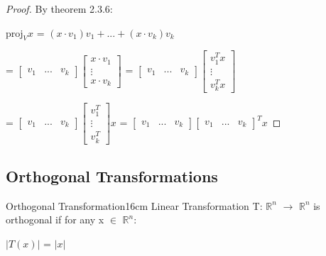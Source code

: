     \begin{proof}
        By {\color{red} theorem 2.3.6}:

        \hspace{0.5cm}
        $\text{proj}_Vx$
        = $(x \cdot v_1)v_1 + ... + (x \cdot v_k)v_k$
        
        \hspace{1.9cm}
        =
        $\begin{bmatrix}
            v_1 & ... & v_k
        \end{bmatrix}
        \begin{bmatrix}
            x \cdot v_1 \\
            \vdots \\
            x \cdot v_k
        \end{bmatrix}$ =
        $\begin{bmatrix}
            v_1 & ... & v_k
        \end{bmatrix}
        \begin{bmatrix}
            v_1^Tx \\
            \vdots \\
            v_k^Tx
        \end{bmatrix}$
        
        \hspace{1.9cm}
        =
        $\begin{bmatrix}
            v_1 & ... & v_k
        \end{bmatrix}
        \begin{bmatrix}
            v_1^T \\
            \vdots \\
            v_k^T
        \end{bmatrix}x$ =
        $\begin{bmatrix}
            v_1 & ... & v_k
        \end{bmatrix}
        \begin{bmatrix}
            v_1 & ... & v_k
        \end{bmatrix}^Tx$
    \end{proof}

    \newpage



\subsection{ Orthogonal Transformations }

    \begin{definition}{Orthogonal Transformation}{16cm}
        Linear Transformation T: $\mathbb{R}^n$ $\rightarrow$ $\mathbb{R}^n$
        is {\color{lblue} orthogonal} if for any x $\in$ $\mathbb{R}^n$:

        \hspace{0.5cm}
        $|T(x)|$ = $|x|$
    \end{definition}

